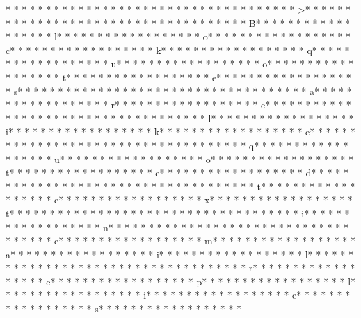 * * *  * * *  * * *  *  * * *  *  * * *  * 
* * *  * * *  * * *  *  * * *  *  * * *  * >* * *  * * *  * * *  *  * * *  *  * * *  *  * * *  * * *  * * *  *  * * *  *  * * *  * B* * *  * * *  * * *  *  * * *  *  * * *  * l* * *  * * *  * * *  *  * * *  *  * * *  * o* * *  * * *  * * *  *  * * *  *  * * *  * c* * *  * * *  * * *  *  * * *  *  * * *  * k* * *  * * *  * * *  *  * * *  *  * * *  * q* * *  * * *  * * *  *  * * *  *  * * *  * u* * *  * * *  * * *  *  * * *  *  * * *  * o* * *  * * *  * * *  *  * * *  *  * * *  * t* * *  * * *  * * *  *  * * *  *  * * *  * e* * *  * * *  * * *  *  * * *  *  * * *  * s* * *  * * *  * * *  *  * * *  *  * * *  *  * * *  * * *  * * *  *  * * *  *  * * *  * a* * *  * * *  * * *  *  * * *  *  * * *  * r* * *  * * *  * * *  *  * * *  *  * * *  * e* * *  * * *  * * *  *  * * *  *  * * *  *  * * *  * * *  * * *  *  * * *  *  * * *  * l* * *  * * *  * * *  *  * * *  *  * * *  * i* * *  * * *  * * *  *  * * *  *  * * *  * k* * *  * * *  * * *  *  * * *  *  * * *  * e* * *  * * *  * * *  *  * * *  *  * * *  *  * * *  * * *  * * *  *  * * *  *  * * *  * q* * *  * * *  * * *  *  * * *  *  * * *  * u* * *  * * *  * * *  *  * * *  *  * * *  * o* * *  * * *  * * *  *  * * *  *  * * *  * t* * *  * * *  * * *  *  * * *  *  * * *  * e* * *  * * *  * * *  *  * * *  *  * * *  * d* * *  * * *  * * *  *  * * *  *  * * *  *  * * *  * * *  * * *  *  * * *  *  * * *  * t* * *  * * *  * * *  *  * * *  *  * * *  * e* * *  * * *  * * *  *  * * *  *  * * *  * x* * *  * * *  * * *  *  * * *  *  * * *  * t* * *  * * *  * * *  *  * * *  *  * * *  *  * * *  * * *  * * *  *  * * *  *  * * *  * i* * *  * * *  * * *  *  * * *  *  * * *  * n* * *  * * *  * * *  *  * * *  *  * * *  *  * * *  * * *  * * *  *  * * *  *  * * *  * e* * *  * * *  * * *  *  * * *  *  * * *  * m* * *  * * *  * * *  *  * * *  *  * * *  * a* * *  * * *  * * *  *  * * *  *  * * *  * i* * *  * * *  * * *  *  * * *  *  * * *  * l* * *  * * *  * * *  *  * * *  *  * * *  *  * * *  * * *  * * *  *  * * *  *  * * *  * r* * *  * * *  * * *  *  * * *  *  * * *  * e* * *  * * *  * * *  *  * * *  *  * * *  * p* * *  * * *  * * *  *  * * *  *  * * *  * l* * *  * * *  * * *  *  * * *  *  * * *  * i* * *  * * *  * * *  *  * * *  *  * * *  * e* * *  * * *  * * *  *  * * *  *  * * *  * s* * *  * * *  * * *  *  * * *  *  * * *  * 
